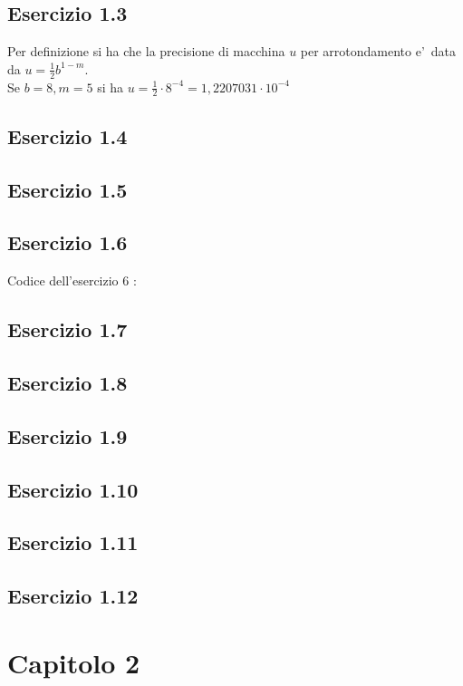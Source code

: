 \documentclass[a4paper]{article}
\begin{document}
\subsection{\textbf{Esercizio 1.3}}

Per definizione si ha che la precisione di macchina \(u\) per arrotondamento e'\ data da
\(
u=\frac{1}{2} b ^{1-m}
\). \\
Se \(b=8, m=5\) si ha \( u = \frac{1}{2}\cdot 8^{-4} = 1,2207031 \cdot 10^{-4} \)

\subsection{\textbf{Esercizio 1.4}}

\subsection{\textbf{Esercizio 1.5}}

\subsection{\textbf{Esercizio 1.6}}
Codice dell'esercizio 6 : 

\subsection{\textbf{Esercizio 1.7}}

\subsection{\textbf{Esercizio 1.8}}

\subsection{\textbf{Esercizio 1.9}}

\subsection{\textbf{Esercizio 1.10}}

\subsection{\textbf{Esercizio 1.11}}

\subsection{\textbf{Esercizio 1.12}}

\section{\textbf{Capitolo 2}}
\end{document}
